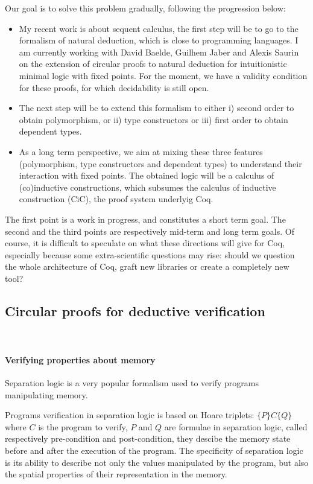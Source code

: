 \documentclass[11pt,twocolumn]{article}
\begin{document}
\smallskip
Our goal is to solve this problem gradually, following the progression below:
\begin{itemize}
\item My recent work is about sequent calculus, the first step will be to go to the formalism of natural deduction, which is close to programming languages. I am currently working with 
David Baelde, Guilhem Jaber and Alexis Saurin on the extension of circular proofs to natural deduction for intuitionistic minimal logic with fixed points. For the moment, we have a validity condition  for these proofs, for which decidability is still open.


\item The next step will be to extend this formalism to either  i) second order to obtain polymorphism, or ii) type constructors or iii) first order to obtain dependent types.  

\item As a long term perspective, we aim at mixing these three features (polymorphism, type constructors and dependent types) to understand their interaction with fixed points. The obtained logic will be a calculus of (co)inductive constructions, which subsumes the calculus of inductive construction (CiC), the proof system underlyig Coq.
  \end{itemize}


\smallskip
The first point is a work in progress, and constitutes a short term goal. The second and the third points are respectively mid-term and long term goals. Of course, it is difficult to speculate on what these directions will give for Coq, especially because some extra-scientific questions may rise: should we question the whole architecture of Coq, graft new libraries or create a completely new tool? 
  



\subsection{Circular proofs for deductive verification}~\label{CircForVerif}


\paragraph{Verifying properties about memory}

Separation logic \cite{Reynolds2002} is a very popular formalism used to verify programs manipulating memory.

Programs verification in separation logic is based on Hoare triplets: $\{P\} C \{Q\}$ where $C$ is the program to verify, $P$ and $Q$ are formulae in separation logic, called respectively pre-condition and post-condition, they descibe the memory state before and after the execution of the program. The specificity of separation logic is its ability to describe not only the values manipulated by the program, but also the spatial properties of their representation in the memory. 
\end{document}
